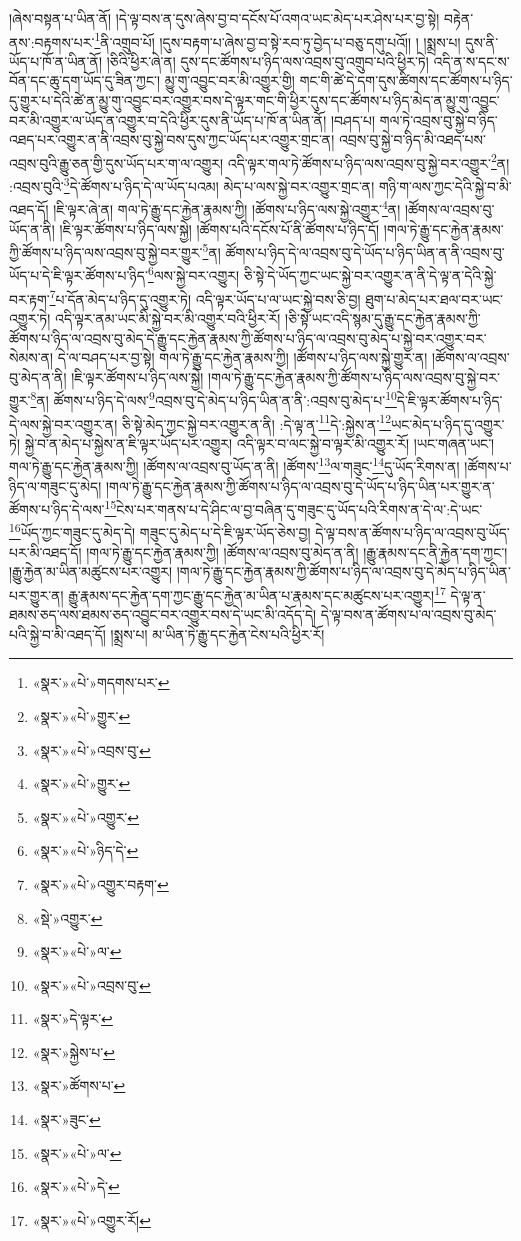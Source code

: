 །ཞེས་བསྟན་པ་ཡིན་ནོ། །དེ་ལྟ་བས་ན་དུས་ཞེས་བྱ་བ་དངོས་པོ་འགའ་ཡང་མེད་པར་ཤེས་པར་བྱ་སྟེ། བརྟེན་ནས་:བརྟགས་པར་\footnote{«སྣར་»«པེ་»གདགས་པར་}ནི་འགྲུབ་པོ། །དུས་བརྟག་པ་ཞེས་བྱ་བ་སྟེ་རབ་ཏུ་བྱེད་པ་བཅུ་དགུ་པའོ།། །
།སྨྲས་པ། དུས་ནི་ཡོད་པ་ཁོ་ན་ཡིན་ནོ། །ཅིའི་ཕྱིར་ཞེ་ན། དུས་དང་ཚོགས་པ་ཉིད་ལས་འབྲས་བུ་འགྲུབ་པའི་ཕྱིར་ཏེ། འདི་ན་ས་དང་ས་བོན་དང་ཆུ་དག་ཡོད་དུ་ཟིན་ཀྱང་། མྱུ་གུ་འབྱུང་བར་མི་འགྱུར་གྱི། གང་གི་ཚེ་དེ་དག་དུས་ཚིགས་དང་ཚོགས་པ་ཉིད་དུ་གྱུར་པ་དེའི་ཚེ་ན་མྱུ་གུ་འབྱུང་བར་འགྱུར་བས་དེ་ལྟར་གང་གི་ཕྱིར་དུས་དང་ཚོགས་པ་ཉིད་མེད་ན་མྱུ་གུ་འབྱུང་བར་མི་འགྱུར་ལ་ཡོད་ན་འགྱུར་བ་དེའི་ཕྱིར་དུས་ནི་ཡོད་པ་ཁོ་ན་ཡིན་ནོ། །བཤད་པ། གལ་ཏེ་འབྲས་བུ་སྐྱེ་བ་ཉིད་འཐད་པར་འགྱུར་ན་ནི་འབྲས་བུ་སྐྱེ་བས་དུས་ཀྱང་ཡོད་པར་འགྱུར་གྲང་ན། འབྲས་བུ་སྐྱེ་བ་ཉིད་མི་འཐད་པས་འབྲས་བུའི་རྒྱུ་ཅན་གྱི་དུས་ཡོད་པར་ག་ལ་འགྱུར། འདི་ལྟར་གལ་ཏེ་ཚོགས་པ་ཉིད་ལས་འབྲས་བུ་སྐྱེ་བར་འགྱུར་\footnote{«སྣར་»«པེ་»གྱུར་}ན། :འབྲས་བུའི་\footnote{«སྣར་»«པེ་»འབྲས་བུ་}དེ་ཚོགས་པ་ཉིད་དེ་ལ་ཡོད་པའམ། མེད་པ་ལས་སྐྱེ་བར་འགྱུར་གྲང་ན། གཉི་ག་ལས་ཀྱང་དེའི་སྐྱེ་བ་མི་འཐད་དོ། །ཇི་ལྟར་ཞེ་ན། གལ་ཏེ་རྒྱུ་དང་རྐྱེན་རྣམས་ཀྱི། །ཚོགས་པ་ཉིད་ལས་སྐྱེ་འགྱུར་\footnote{«སྣར་»«པེ་»གྱུར་}ན། །ཚོགས་ལ་འབྲས་བུ་ཡོད་ན་ནི། །ཇི་ལྟར་ཚོགས་པ་ཉིད་ལས་སྐྱེ། །ཚོགས་པའི་དངོས་པོ་ནི་ཚོགས་པ་ཉིད་དོ། །གལ་ཏེ་རྒྱུ་དང་རྐྱེན་རྣམས་ཀྱི་ཚོགས་པ་ཉིད་ལས་འབྲས་བུ་སྐྱེ་བར་གྱུར་\footnote{«སྣར་»«པེ་»འགྱུར་}ན། ཚོགས་པ་ཉིད་དེ་ལ་འབྲས་བུ་དེ་ཡོད་པ་ཉིད་ཡིན་ན་ནི་འབྲས་བུ་ཡོད་པ་དེ་ཇི་ལྟར་ཚོགས་པ་ཉིད་\footnote{«སྣར་»«པེ་»ཉིད་དེ་}ལས་སྐྱེ་བར་འགྱུར། ཅི་སྟེ་དེ་ཡོད་ཀྱང་ཡང་སྐྱེ་བར་འགྱུར་ན་ནི་དེ་ལྟ་ན་དེའི་སྐྱེ་བར་རྟག་\footnote{«སྣར་»«པེ་»འགྱུར་བརྟག་}པ་དོན་མེད་པ་ཉིད་དུ་འགྱུར་ཏེ། འདི་ལྟར་ཡོད་པ་ལ་ཡང་སྐྱེ་བས་ཅི་བྱ། ཐུག་པ་མེད་པར་ཐལ་བར་ཡང་འགྱུར་ཏེ། འདི་ལྟར་ནམ་ཡང་མི་སྐྱེ་བར་མི་འགྱུར་བའི་ཕྱིར་རོ། །ཅི་སྟེ་ཡང་འདི་སྙམ་དུ་རྒྱུ་དང་རྐྱེན་རྣམས་ཀྱི་ཚོགས་པ་ཉིད་ལ་འབྲས་བུ་མེད་དེ་རྒྱུ་དང་རྐྱེན་རྣམས་ཀྱི་ཚོགས་པ་ཉིད་ལ་འབྲས་བུ་མེད་པ་སྐྱེ་བར་འགྱུར་བར་སེམས་ན། དེ་ལ་བཤད་པར་བྱ་སྟེ། གལ་ཏེ་རྒྱུ་དང་རྐྱེན་རྣམས་ཀྱི། །ཚོགས་པ་ཉིད་ལས་སྐྱེ་གྱུར་ན། །ཚོགས་ལ་འབྲས་བུ་མེད་ན་ནི། །ཇི་ལྟར་ཚོགས་པ་ཉིད་ལས་སྐྱེ། །གལ་ཏེ་རྒྱུ་དང་རྐྱེན་རྣམས་ཀྱི་ཚོགས་པ་ཉིད་ལས་འབྲས་བུ་སྐྱེ་བར་གྱུར་\footnote{«སྡེ་»འགྱུར་}ན། ཚོགས་པ་ཉིད་དེ་ལས་\footnote{«སྣར་»«པེ་»ལ་}འབྲས་བུ་དེ་མེད་པ་ཉིད་ཡིན་ན་ནི་:འབྲས་བུ་མེད་པ་\footnote{«སྣར་»«པེ་»འབྲས་བུ་}དེ་ཇི་ལྟར་ཚོགས་པ་ཉིད་དེ་ལས་སྐྱེ་བར་འགྱུར་ན། ཅི་སྟེ་མེད་ཀྱང་སྐྱེ་བར་འགྱུར་ན་ནི། :དེ་ལྟ་ན་\footnote{«སྣར་»དེ་ལྟར་}དེ་:སྐྱེས་ན་\footnote{«སྣར་»སྐྱེས་པ་}ཡང་མེད་པ་ཉིད་དུ་འགྱུར་ཏེ། སྐྱེ་བ་ན་མེད་པ་སྐྱེས་ན་ཇི་ལྟར་ཡོད་པར་འགྱུར། འདི་ལྟར་བ་ལང་སྐྱེ་བ་ལྟར་མི་འགྱུར་རོ། །ཡང་གཞན་ཡང་། གལ་ཏེ་རྒྱུ་དང་རྐྱེན་རྣམས་ཀྱི། །ཚོགས་ལ་འབྲས་བུ་ཡོད་ན་ནི། །ཚོགས་\footnote{«སྣར་»ཚོགས་པ་}ལ་གཟུང་\footnote{«སྣར་»ཟུང་}དུ་ཡོད་རིགས་ན། །ཚོགས་པ་ཉིད་ལ་གཟུང་དུ་མེད། །གལ་ཏེ་རྒྱུ་དང་རྐྱེན་རྣམས་ཀྱི་ཚོགས་པ་ཉིད་ལ་འབྲས་བུ་དེ་ཡོད་པ་ཉིད་ཡིན་པར་གྱུར་ན་ཚོགས་པ་ཉིད་དེ་ལས་\footnote{«སྣར་»«པེ་»ལ་}ངེས་པར་གནས་པ་དེ་ཤིང་ལ་བྱ་བཞིན་དུ་གཟུང་དུ་ཡོད་པའི་རིགས་ན་དེ་ལ་:དེ་ཡང་\footnote{«སྣར་»«པེ་»དེ་}ཡོད་ཀྱང་གཟུང་དུ་མེད་དེ། གཟུང་དུ་མེད་པ་དེ་ཇི་ལྟར་ཡོད་ཅེས་བྱ། དེ་ལྟ་བས་ན་ཚོགས་པ་ཉིད་ལ་འབྲས་བུ་ཡོད་པར་མི་འཐད་དོ། །གལ་ཏེ་རྒྱུ་དང་རྐྱེན་རྣམས་ཀྱི། །ཚོགས་ལ་འབྲས་བུ་མེད་ན་ནི། །རྒྱུ་རྣམས་དང་ནི་རྐྱེན་དག་ཀྱང་། །རྒྱུ་རྐྱེན་མ་ཡིན་མཚུངས་པར་འགྱུར། །གལ་ཏེ་རྒྱུ་དང་རྐྱེན་རྣམས་ཀྱི་ཚོགས་པ་ཉིད་ལ་འབྲས་བུ་དེ་མེད་པ་ཉིད་ཡིན་པར་གྱུར་ན། རྒྱུ་རྣམས་དང་རྐྱེན་དག་ཀྱང་རྒྱུ་དང་རྐྱེན་མ་ཡིན་པ་རྣམས་དང་མཚུངས་པར་འགྱུར།\footnote{«སྣར་»«པེ་»འགྱུར་རོ།} དེ་ལྟ་ན་ཐམས་ཅད་ལས་ཐམས་ཅད་འབྱུང་བར་འགྱུར་བས་དེ་ཡང་མི་འདོད་དེ། དེ་ལྟ་བས་ན་ཚོགས་པ་ལ་འབྲས་བུ་མེད་པའི་སྐྱེ་བ་མི་འཐད་དོ། །སྨྲས་པ། མ་ཡིན་ཏེ་རྒྱུ་དང་རྐྱེན་ངེས་པའི་ཕྱིར་རོ། 